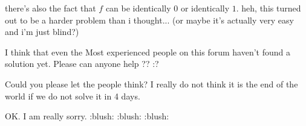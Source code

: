 \begin{solution}
	there's also the fact that $ f $ can be identically $ 0 $ or identically $ 1 $.  heh, this turned out to be a harder problem than i thought... (or maybe it's actually very easy and i'm just blind?)
\end{solution}






\begin{solution}
	I think that even the Most experienced people on this forum haven't found a solution yet. Please can anyone help ?? :?
\end{solution}



\begin{solution}
	Could you please let the people think? I really do not think it is the end of the world if we do not solve it in 4 days.
\end{solution}



\begin{solution}
	OK. I am really sorry.  :blush:  :blush:  :blush:
\end{solution}




